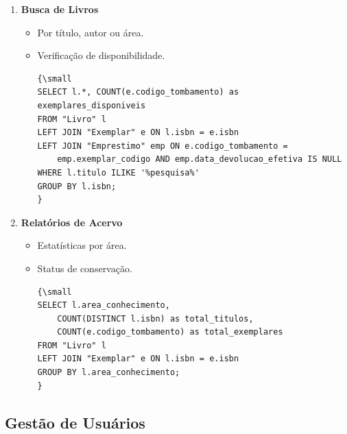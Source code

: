 \documentclass[12pt,a4paper]{article}
\begin{document}
\begin{tcolorbox}[title=Consultas do Acervo]
\begin{enumerate}[label=\textbf{CA\arabic*.}]
    \item \textbf{Busca de Livros}
    \begin{itemize}
        \item Por título, autor ou área.
        \item Verificação de disponibilidade.
        \begin{verbatim}
{\small
SELECT l.*, COUNT(e.codigo_tombamento) as exemplares_disponiveis
FROM "Livro" l
LEFT JOIN "Exemplar" e ON l.isbn = e.isbn
LEFT JOIN "Emprestimo" emp ON e.codigo_tombamento =
    emp.exemplar_codigo AND emp.data_devolucao_efetiva IS NULL
WHERE l.titulo ILIKE '%pesquisa%'
GROUP BY l.isbn;
}
        \end{verbatim}
    \end{itemize}

    \item \textbf{Relatórios de Acervo}
    \begin{itemize}
        \item Estatísticas por área.
        \item Status de conservação.
        \begin{verbatim}
{\small
SELECT l.area_conhecimento,
    COUNT(DISTINCT l.isbn) as total_titulos,
    COUNT(e.codigo_tombamento) as total_exemplares
FROM "Livro" l
LEFT JOIN "Exemplar" e ON l.isbn = e.isbn
GROUP BY l.area_conhecimento;
}
        \end{verbatim}
    \end{itemize}
\end{enumerate}
\end{tcolorbox}

\subsection{Gestão de Usuários}
\end{document}
